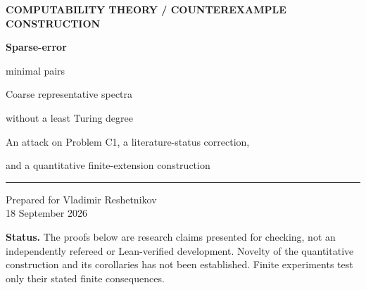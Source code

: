 \documentclass[11pt,a4paper]{article}
\newcommand{\leT}{\leq_{\mathrm T}}
\theoremstyle{definition}
\theoremstyle{remark}
\begin{document}
\begin{titlepage}
\vspace*{12mm}
{\small\sffamily\bfseries\color{navy}COMPUTABILITY THEORY \quad / \quad COUNTEREXAMPLE CONSTRUCTION\par}
\vspace{14mm}
{\Huge\bfseries\color{navy}Sparse-error\par minimal pairs\par}
\vspace{7mm}
{\LARGE Coarse representative spectra\par without a least Turing degree\par}
\vspace{10mm}
{\large An attack on Problem C1, a literature-status correction,\par and a quantitative finite-extension construction\par}
\vspace{12mm}
\noindent\rule{\textwidth}{0.5pt}
\vspace{5mm}
\noindent Prepared for Vladimir Reshetnikov\\[3pt]
18 September 2026
\vspace{9mm}
\begin{abstract}
We select the least-representative question C1 from the supplied survey. The initial source audit changes its status: the coarse negative answer is already implicit in an earlier theorem, so it should not be advertised as a newly settled open problem. We then give an independent, self-contained construction with stronger control. For every computable nondecreasing unbounded order $h(n)\leq n+1$ and every positive rational $b$, there are individually $1$-generic sets $A,B\leT\emptyset''$ whose degrees form a minimal pair and for which
\[
\sum_{n\in A\triangle B}\frac1{h(n)}\leq b.
\]
In particular, their disagreement count is $o(h(N))$, yet their common coarse class is nonzero and has no least Turing-degree representative. The central lemma synchronizes finitely many dense convergence domains along a one-bit path. We also identify the representative spectrum with the upward spectrum of coarse descriptions and construct, above every Turing degree, a coarse class with that degree as an unattained infimum. Detailed English proofs, exact finite checks, and an explicit verification boundary are included.
\end{abstract}
\vfill
\noindent\small\textbf{Status.} The proofs below are research claims presented for checking, not an independently refereed or Lean-verified development. Novelty of the quantitative construction and its corollaries has not been established. Finite experiments test only their stated finite consequences.
\end{titlepage}
{\small\tableofcontents}
\newpage
\end{document}
